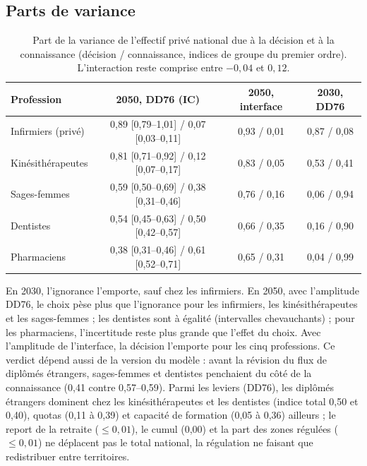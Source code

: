 \subsection{Parts de variance}
\begin{table}[h]\centering\small
\begin{tabular}{lccc}
\toprule
Profession & 2050, DD76 (IC) & 2050, interface & 2030, DD76 \\
\midrule
Infirmiers (privé) & 0,89 [0,79--1,01] / 0,07 [0,03--0,11]\mesure{} & 0,93 / 0,01\mesure{} & 0,87 / 0,08\mesure{} \\
Kinésithérapeutes & 0,81 [0,71--0,92] / 0,12 [0,07--0,17]\mesure{} & 0,83 / 0,05\mesure{} & 0,53 / 0,41\mesure{} \\
Sages-femmes & 0,59 [0,50--0,69] / 0,38 [0,31--0,46]\mesure{} & 0,76 / 0,16\mesure{} & 0,06 / 0,94\mesure{} \\
Dentistes & 0,54 [0,45--0,63] / 0,50 [0,42--0,57]\mesure{} & 0,66 / 0,35\mesure{} & 0,16 / 0,90\mesure{} \\
Pharmaciens & 0,38 [0,31--0,46] / 0,61 [0,52--0,71]\mesure{} & 0,65 / 0,31\mesure{} & 0,04 / 0,99\mesure{} \\
\bottomrule
\end{tabular}
\caption{Part de la variance de l'effectif privé national due à la décision et à la connaissance (décision / connaissance, indices de groupe
du premier ordre). L'interaction reste comprise entre $-0{,}04$ et $0{,}12$\mesure{}.}\label{a5-tab:groupes}
\end{table}

En 2030, l'ignorance l'emporte, sauf chez les infirmiers. En 2050, avec l'amplitude DD76, le choix pèse plus que
l'ignorance pour les infirmiers, les kinésithérapeutes et les sages-femmes ; les dentistes sont à égalité
(intervalles chevauchants) ; pour les pharmaciens, l'incertitude reste plus grande que l'effet du choix. Avec
l'amplitude de l'interface, la décision l'emporte pour les cinq professions. Ce verdict dépend aussi de la version du
modèle : avant la révision du flux de diplômés étrangers, sages-femmes et dentistes penchaient du côté de la
connaissance (0,41 contre 0,57--0,59\mesure{}). Parmi les leviers (DD76), les diplômés étrangers dominent chez les
kinésithérapeutes et les dentistes (indice total 0,50 et 0,40\mesure{}), quotas (0,11 à 0,39\mesure{}) et capacité de
formation (0,05 à 0,36\mesure{}) ailleurs ; le report de la retraite ($\le 0{,}01$), le cumul (0,00) et la part des
zones régulées ($\le 0{,}01$\mesure{}) ne déplacent pas le total national, la régulation ne faisant que redistribuer
entre territoires.

